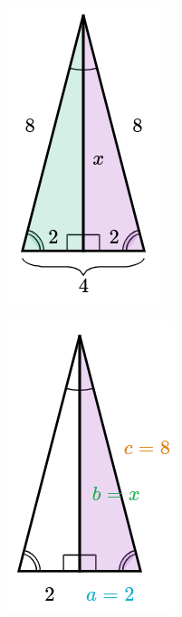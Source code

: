 \begin{solutionbox}{13cm}
    \begin{minipage}{0.3\textwidth}
        \begin{figure}[H]
            \centering
            \includegraphics[width=0.5\linewidth]{../images/pitagoras1a.png}
            \caption{}
            \label{fig:pitagoras1a}
        \end{figure}
        \begin{figure}[H]
            \centering
            \includegraphics[width=0.5\linewidth]{../images/pitagoras1b.png}

\end{figure}
\end{minipage}
\end{solutionbox}
